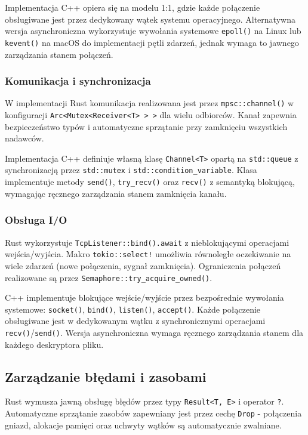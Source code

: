 Implementacja C++ opiera się na modelu 1:1, gdzie każde połączenie obsługiwane jest przez dedykowany wątek systemu operacyjnego. Alternatywna wersja asynchroniczna wykorzystuje wywołania systemowe \texttt{epoll()} na Linux lub \texttt{kevent()} na macOS do implementacji pętli zdarzeń, jednak wymaga to jawnego zarządzania stanem połączeń.

\subsubsection{Komunikacja i synchronizacja}

W implementacji Rust komunikacja realizowana jest przez \texttt{mpsc::channel()} w konfiguracji \texttt{Arc<Mutex<Receiver<T> > >} dla wielu odbiorców. Kanał zapewnia bezpieczeństwo typów i automatyczne sprzątanie przy zamknięciu wszystkich nadawców.

Implementacja C++ definiuje własną klasę \texttt{Channel<T>} opartą na \texttt{std::queue} z synchronizacją przez \texttt{std::mutex} i \texttt{std::condition\_variable}. Klasa implementuje metody \texttt{send()}, \texttt{try\_recv()} oraz \texttt{recv()} z semantyką blokującą, wymagając ręcznego zarządzania stanem zamknięcia kanału.

\subsubsection{Obsługa I/O}

Rust wykorzystuje \texttt{TcpListener::bind().await} z nieblokującymi operacjami \mbox{wejścia/wyjścia}. Makro \texttt{tokio::select!} umożliwia równoległe oczekiwanie na wiele zdarzeń (nowe połączenia, sygnał zamknięcia). Ograniczenia połączeń realizowane są przez \texttt{Semaphore::try\_acquire\_owned()}.

C++ implementuje blokujące wejście/wyjście przez bezpośrednie wywołania systemowe: \texttt{socket()}, \texttt{bind()}, \texttt{listen()}, \texttt{accept()}. Każde połączenie obsługiwane jest w dedykowanym wątku z synchronicznymi operacjami \texttt{recv()}/\texttt{send()}. Wersja asynchroniczna wymaga ręcznego zarządzania stanem dla każdego deskryptora pliku.

\subsection{Zarządzanie błędami i zasobami}

Rust wymusza jawną obsługę błędów przez typy \texttt{Result<T, E>} i operator \texttt{?}. Automatyczne sprzątanie zasobów zapewniany jest przez cechę \texttt{Drop} - połączenia gniazd, alokacje pamięci oraz uchwyty wątków są automatycznie zwalniane.

